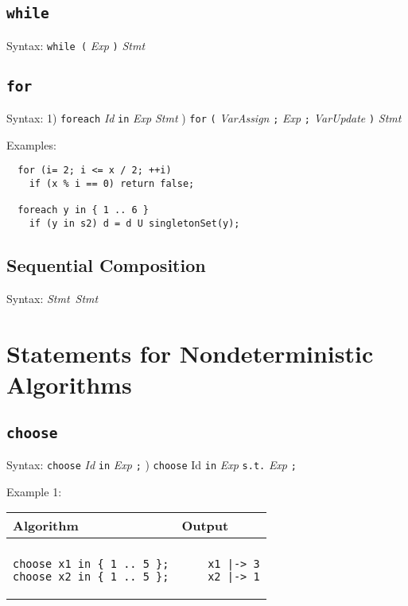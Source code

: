 \documentclass[a4paper]{report}
\begin{document}
\subsection{\texttt{while}}

Syntax: \verb'while (' {\it Exp} \verb')' {\it Stmt}


\subsection{\texttt{for}}

Syntax: 1) \verb"foreach" {\it Id} \verb"in" {\it Exp}  {\it Stmt} ) \verb"for" \verb"(" {\it VarAssign} \verb";" {\it Exp} \verb";" {\it VarUpdate} \verb")" {\it Stmt}

Examples:
\begin{verbatim}
  for (i= 2; i <= x / 2; ++i)
    if (x % i == 0) return false;

  foreach y in { 1 .. 6 }
    if (y in s2) d = d U singletonSet(y);
\end{verbatim}



\subsection{Sequential Composition}

Syntax: {\it Stmt}~{\it Stmt}

\section{Statements for Nondeterministic Algorithms}

\subsection{\texttt{choose}}

Syntax:  \verb"choose" {\it Id} \verb"in" {\it Exp} \verb";"  ) \verb"choose" Id \verb"in" {\it Exp} \verb"s.t." {\it Exp} \verb";"

Example 1:
\begin{center}
\begin{tabular}{ll}
Algorithm & Output\\
\hline
\\
\begin{minipage}{.45\textwidth}
\begin{verbatim}
choose x1 in { 1 .. 5 };
choose x2 in { 1 .. 5 };
\end{verbatim}
\end{minipage}
&
\begin{minipage}{.45\textwidth}
\begin{verbatim}
    x1 |-> 3
    x2 |-> 1
\end{verbatim}
\end{minipage}
\end{tabular}
\end{center}
\end{document}

